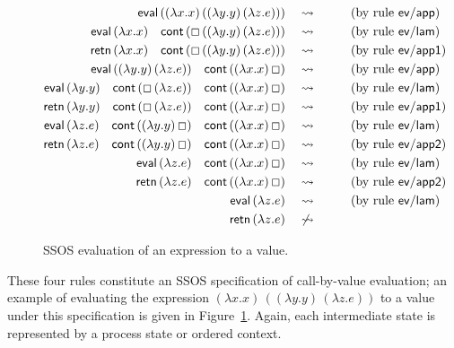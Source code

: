 \begin{figure}
\begin{align*}
{\sf eval}\,((\lambda x.x)\,((\lambda y.y)\,(\lambda z.e))) 
& ~~~\rightsquigarrow~~ \tag{by rule ${\sf ev/app}$}\\
{\sf eval}\,(\lambda x.x) \quad
{\sf cont}\,(\Box\,((\lambda y.y)\,(\lambda z.e)))
& ~~~\rightsquigarrow~~ \tag{by rule ${\sf ev/lam}$}\\
{\sf retn}\,(\lambda x.x) \quad
{\sf cont}\,(\Box\,((\lambda y.y)\,(\lambda z.e)))
& ~~~\rightsquigarrow~~ \tag{by rule ${\sf ev/app1}$}\\
{\sf eval}\,((\lambda y.y)\,(\lambda z.e)) \quad
{\sf cont}\,((\lambda x.x)\,\Box)
& ~~~\rightsquigarrow~~ \tag{by rule ${\sf ev/app}$}\\
{\sf eval}\,(\lambda y.y) \quad
{\sf cont}\,(\Box\,(\lambda z.e)) \quad
{\sf cont}\,((\lambda x.x)\,\Box)
& ~~~\rightsquigarrow~~ \tag{by rule ${\sf ev/lam}$}\\
{\sf retn}\,(\lambda y.y) \quad
{\sf cont}\,(\Box\,(\lambda z.e)) \quad
{\sf cont}\,((\lambda x.x)\,\Box)
& ~~~\rightsquigarrow~~ \tag{by rule ${\sf ev/app1}$}\\
{\sf eval}\,(\lambda z.e) \quad
{\sf cont}\,((\lambda y.y)\,\Box) \quad
{\sf cont}\,((\lambda x.x)\,\Box)
& ~~~\rightsquigarrow~~ \tag{by rule ${\sf ev/lam}$}\\
{\sf retn}\,(\lambda z.e) \quad
{\sf cont}\,((\lambda y.y)\,\Box) \quad
{\sf cont}\,((\lambda x.x)\,\Box)
& ~~~\rightsquigarrow~~ \tag{by rule ${\sf ev/app2}$}\\
{\sf eval}\,(\lambda z.e) \quad
{\sf cont}\,((\lambda x.x)\,\Box)
& ~~~\rightsquigarrow~~ \tag{by rule ${\sf ev/lam}$}\\
{\sf retn}\,(\lambda z.e) \quad
{\sf cont}\,((\lambda x.x)\,\Box)
& ~~~\rightsquigarrow~~ \tag{by rule ${\sf ev/app2}$}\\
{\sf eval}\,(\lambda z.e) 
& ~~~\rightsquigarrow~~ \tag{by rule ${\sf ev/lam}$}\\
{\sf retn}\,(\lambda z.e) 
& ~~~\not\rightsquigarrow~~ 
\end{align*}
\caption{SSOS evaluation of an expression to a value.}
\label{fig:ssos-example}
\end{figure}

These four rules constitute an SSOS specification of call-by-value
evaluation; an example of evaluating the expression $(\lambda
x.x)\,((\lambda y.y)\,(\lambda z.e))$ to a value under this
specification is given in Figure~\ref{fig:ssos-example}.  Again, each
intermediate state is represented by a process state or ordered
context.


